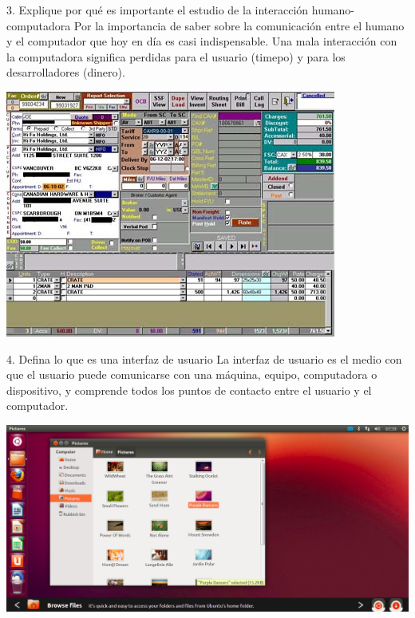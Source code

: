\documentclass{beamer}
\begin{document}
\begin{frame}
\begin{block}{3. Explique por qué es importante el estudio de la interacción humano-computadora}
Por la importancia de saber sobre la comunicación entre el humano y el computador que hoy en día es casi indispensable. Una mala interacción con la computadora significa perdidas para el usuario (timepo) y para los desarrolladores (dinero).
\begin{center}
\includegraphics[scale = 0.4]{3_1.jpg}
\end{center}
\end{block}
\end{frame}

\begin{frame}
\begin{block}{4. Defina lo que es una interfaz de usuario}
La interfaz de usuario es el medio con que el usuario puede comunicarse con una máquina, equipo, computadora o dispositivo, y comprende todos los puntos de contacto entre el usuario y el computador.
\begin{center}
\includegraphics[scale = 0.2]{4.png}
\end{center}
\end{block}
\end{frame}
\end{document}

